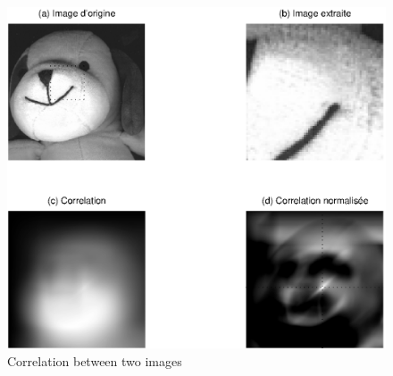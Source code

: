 \begin{exo}
\begin{figure}[ht]
    \begin{center}
    \includegraphics [scale = 0.7]{images/correlation-2d.eps}
    \end{center}
    \caption{Correlation between two images}
              \label{fig-correlation-2d}
\end{figure}
\end{exo}
 
